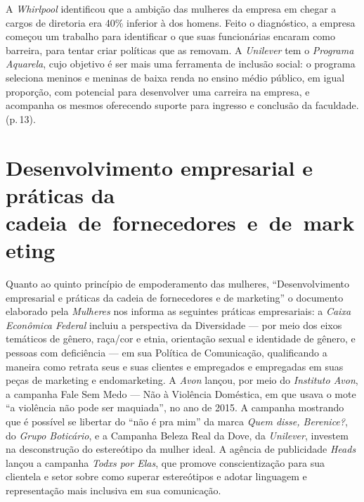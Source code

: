 A \emph{Whirlpool} identificou que a ambição das mulheres da empresa em
chegar a cargos de diretoria era 40\% inferior à dos homens. Feito o
diagnóstico, a empresa começou um trabalho para identificar o que suas
funcionárias encaram como barreira, para tentar criar políticas que as
removam. A \emph{Unilever} tem o \emph{Programa Aquarela}, cujo objetivo
é ser mais uma ferramenta de inclusão social: o programa seleciona
meninos e meninas de baixa renda no ensino médio público, em igual
proporção, com potencial para desenvolver uma carreira na empresa, e
acompanha os mesmos oferecendo suporte para ingresso e conclusão da
faculdade. (p.\,13).

\section{Desenvolvimento empresarial e práticas da cadeia~de~fornecedores~e~de~marketing}

Quanto ao quinto princípio de empoderamento das mulheres,
``Desenvolvimento empresarial e práticas da cadeia de fornecedores e de
marketing'' o documento elaborado pela \emph{ Mulheres} nos informa
as seguintes práticas empresariais: a \emph{Caixa Econômica Federal}
incluiu a perspectiva da Diversidade --- por meio dos eixos temáticos de
gênero, raça/cor e etnia, orientação sexual e identidade de gênero, e
pessoas com deficiência --- em sua Política de Comunicação, qualificando
a maneira como retrata seus e suas clientes e empregados e empregadas em
suas peças de marketing e endomarketing. A \emph{Avon} lançou, por meio
do \emph{Instituto Avon}, a campanha Fale Sem Medo --- Não à Violência
Doméstica, em que usava o mote ``a violência não pode ser maquiada'', no
ano de 2015. A campanha mostrando que é possível se libertar do ``não é
pra mim'' da marca \emph{Quem disse, Berenice?}, do \emph{Grupo
Boticário}, e a Campanha Beleza Real da Dove, da \emph{Unilever},
investem na desconstrução do estereótipo da mulher ideal. A agência de
publicidade \emph{Heads} lançou a campanha \emph{Todxs por Elas}, que
promove conscientização para sua clientela e setor sobre como superar
estereótipos e adotar linguagem e representação mais inclusiva em sua
comunicação.


